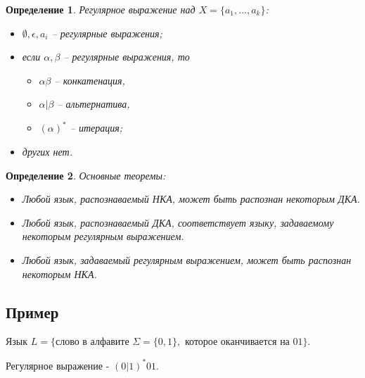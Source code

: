 \documentclass[a4paper, 12pt]{extarticle}
\newtheorem*{definition}{Определение}
\begin{document}
\begin{definition}
Регулярное выражение над $X=\{a_1, ... ,a_k\}$:
\begin{itemize}
 \item $\emptyset, \epsilon, a_i$ -- регулярные выражения;
 \item если $\alpha, \beta$ -- регулярные выражения, то
 \begin{itemize}
  \item $\alpha\beta$ -- конкатенация,
  \item $\alpha|\beta$ -- альтернатива,
  \item $(\alpha)^*$ -- итерация;
 \end{itemize}
 \item других нет.
\end{itemize}
\end{definition}

\begin{definition}
 Основные теоремы:
 \begin{itemize}
  \item Любой язык, распознаваемый НКА, может быть распознан некоторым ДКА.
  \item Любой язык, распознаваемый ДКА, соответствует языку, задаваемому некоторым регулярным выражением.
  \item Любой язык, задаваемый регулярным выражением, может быть распознан некоторым НКА.
 \end{itemize}
\end{definition}

\subsection*{Пример}
Язык $L = \{\text{слово в алфавите }\Sigma = \{0, 1\},\text{ которое оканчивается на }01\}$.

Регулярное выражение - $(0|1)^*01$.

\begin{figure}[h!!]
\end{figure}
\end{document}
